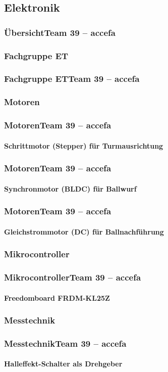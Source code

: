 \subsection{Elektronik}

\author{Ervin Mazlagi\'c}

\begin{frame}
	\frametitle{Übersicht\hfill{}\footnotesize Team 39 -- accefa}
\end{frame}

\subsubsection{Fachgruppe ET}
\begin{frame}
	\frametitle{Fachgruppe ET\hfill{}\footnotesize Team 39 -- accefa}
\end{frame}

\subsubsection{Motoren}
\begin{frame}
	\frametitle{Motoren\hfill{}\footnotesize Team 39 -- accefa}
	\framesubtitle{Schrittmotor (Stepper) für Turmausrichtung}
\end{frame}

\begin{frame}
	\frametitle{Motoren\hfill{}\footnotesize Team 39 -- accefa}
	\framesubtitle{Synchronmotor (BLDC) für Ballwurf}
\end{frame}

\begin{frame}
	\frametitle{Motoren\hfill{}\footnotesize Team 39 -- accefa}
	\framesubtitle{Gleichstrommotor (DC) für Ballnachführung}
\end{frame}

\subsubsection{Mikrocontroller}
\begin{frame}
	\frametitle{Mikrocontroller\hfill{}\footnotesize Team 39 -- accefa}
	\framesubtitle{Freedomboard FRDM-KL25Z}
\end{frame}

\subsubsection{Messtechnik}
\begin{frame}
	\frametitle{Messtechnik\hfill{}\footnotesize Team 39 -- accefa}
	\framesubtitle{Halleffekt-Schalter als Drehgeber}
\end{frame}
